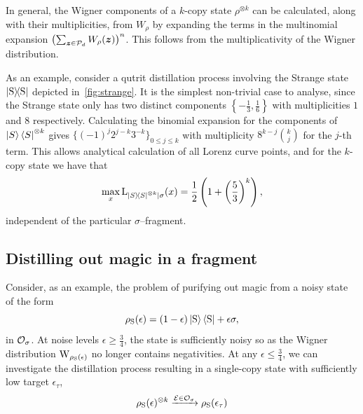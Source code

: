 \documentclass[pra,
aps,
twocolumn,
superscriptaddress,
groupedaddress,
nofootinbib,
reprint
]{revtex4-1}
\begin{document}
In general, the Wigner components of a $k$-copy state $\rho^{\otimes k}$ can be calculated, along with their multiplicities, from $W_\rho$ by expanding the terms in the multinomial expansion $\left( \sum_{\bm{z} \in \mathcal{P}_d} W_\rho(\bm{z}) \right)^n$.
This follows from the multiplicativity of the Wigner distribution.

As an example, consider a qutrit distillation process involving the Strange state $\ketbra{\rm{S}}$ depicted in~\cref{fig:strange}. 
It is the simplest non-trivial case to analyse, since the Strange state only has two distinct components $\left\{ -\frac{1}{3}, \frac{1}{6} \right\}$ with multiplicities $1$ and $8$ respectively.
Calculating the binomial expansion for the components of $\ket{S}\bra{S}^{\otimes k}$ gives $\{(-1)^j 2^{j-k} 3^{-k}\}_{0 \leq j \leq k}$ with multiplicity $8^{k-j} \binom{k}{j}$ for the $j$-th term.
This allows analytical calculation of all Lorenz curve points, and for the $k$-copy state we have that
\begin{equation}\label{eq:Skmax}
    \max_x{{{\rm{L}}_{\ketbra{S}^{\otimes k}|\sigma}}}(x) = \frac{1}{2}\left (1 + \left(\frac{5}{3}\right)^k \right),
\end{equation}
independent of the particular $\sigma$--fragment.  

\subsection{Distilling out magic in a fragment}
Consider, as an example, the problem of purifying out magic from a noisy state of the form
\begin{equation}
    \rho_{\rm{S}}(\epsilon) = (1 - \epsilon) \ket{\rm{S}}\bra{\rm{S}} + \epsilon \sigma,
\end{equation}
in $\mathcal{O}_\sigma$.
At noise levels $\epsilon \geq \frac{3}{4}$, the state is sufficiently noisy so as the Wigner distribution $\W{\rho_{\rm{S}}(\epsilon)}$ no longer contains negativities. 
At any $\epsilon \leq \frac{3}{4}$, we can investigate the distillation process resulting in a single-copy state with sufficiently low target $\epsilon_{\tau}$,
\begin{equation}\label{eq:sdist}
	\rho_{\rm{S}}(\epsilon)^{\otimes k} \xrightarrow{\mathcal{E} \in \mathcal{O}_\sigma} \rho_{\rm{S}}(\epsilon_{\tau})
\end{equation}
\end{document}

